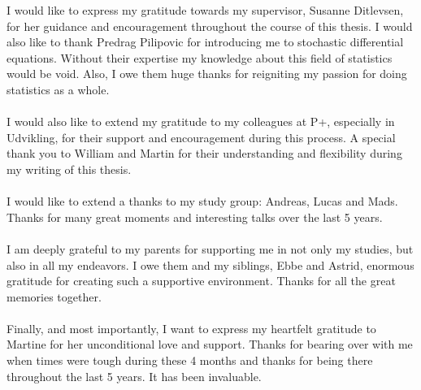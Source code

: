 I would like to express my gratitude towards my supervisor, Susanne Ditlevsen, for her guidance and encouragement throughout the course of this thesis. I would also like to thank Predrag Pilipovic for introducing me to stochastic differential equations. Without their expertise my knowledge about this field of statistics would be void. Also, I owe them huge thanks for reigniting my passion for doing statistics as a whole.\\\\
I would also like to extend my gratitude to my colleagues at P+, especially in Udvikling, for their support and encouragement during this process. A special thank you to William and Martin for their understanding and flexibility during my writing of this thesis.\\\\
I would like to extend a thanks to my study group: Andreas, Lucas and Mads. Thanks for many great moments and interesting talks over the last 5 years. \\\\
I am deeply grateful to my parents for supporting me in not only my studies, but also in all my endeavors. I owe them and my siblings, Ebbe and Astrid, enormous gratitude for creating such a supportive environment. Thanks for all the great memories together.\\\\
Finally, and most importantly, I want to express my heartfelt gratitude to Martine for her unconditional love and support. Thanks for bearing over with me when times were tough during these 4 months and thanks for being there throughout the last 5 years. It has been invaluable. 